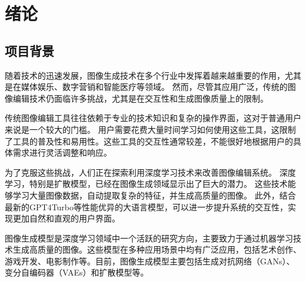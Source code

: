 \documentclass[a4paper,AutoFakeBold,oneside,12pt]{book}
\begin{document}
\blankmatter
  

\blankmatter
  

\blankmatter
  

\blankmatter
 


\frontmatter
\tableofcontents %

\newpage\mainmatter
{}



\chapter{绪论} %
\section{项目背景}
随着技术的迅速发展，图像生成技术在多个行业中发挥着越来越重要的作用，尤其是在媒体娱乐、数字营销和智能医疗等领域。
然而，尽管其应用广泛，传统的图像编辑技术仍面临许多挑战，尤其是在交互性和生成图像质量上的限制。

传统图像编辑工具往往依赖于专业的技术知识和复杂的操作界面，这对于普通用户来说是一个较大的门槛。
用户需要花费大量时间学习如何使用这些工具，这限制了工具的普及性和易用性。这些工具的交互性通常较差，不能很好地根据用户的具体需求进行灵活调整和响应。

为了克服这些挑战，人们正在探索利用深度学习技术来改善图像编辑系统。
深度学习，特别是扩散模型，已经在图像生成领域显示出了巨大的潜力。
这些技术能够学习大量图像数据，自动提取复杂的特征，并生成高质量的图像。
此外，结合最新的GPT4Turbo等性能优异的大语言模型，可以进一步提升系统的交互性，实现更加自然和直观的用户界面。

图像生成模型是深度学习领域中一个活跃的研究方向，主要致力于通过机器学习技术生成高质量的图像。这些模型在多种应用场景中均有广泛应用，包括艺术创作、游戏开发、电影制作等。目前，图像生成模型主要包括生成对抗网络（GANs）、变分自编码器（VAEs）和扩散模型等。
\end{document}
